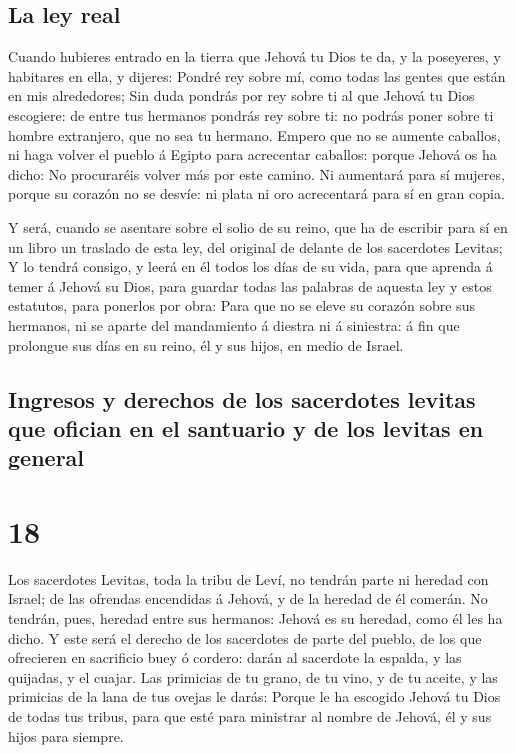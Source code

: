 \hypertarget{la-ley-real}{%
\subsection{La ley real}\label{la-ley-real}}

 Cuando hubieres entrado en la tierra que Jehová tu Dios
te da, y la poseyeres, y habitares en ella, y dijeres: Pondré rey sobre
mí, como todas las gentes que están en mis alrededores; 
Sin duda pondrás por rey sobre ti al que Jehová tu Dios escogiere: de
entre tus hermanos pondrás rey sobre ti: no podrás poner sobre ti hombre
extranjero, que no sea tu hermano.  Empero que no se
aumente caballos, ni haga volver el pueblo á Egipto para acrecentar
caballos: porque Jehová os ha dicho: No procuraréis volver más por este
camino.  Ni aumentará para sí mujeres, porque su corazón
no se desvíe: ni plata ni oro acrecentará para sí en gran copia.

 Y será, cuando se asentare sobre el solio de su reino,
que ha de escribir para sí en un libro un traslado de esta ley, del
original de delante de los sacerdotes Levitas;  Y lo
tendrá consigo, y leerá en él todos los días de su vida, para que
aprenda á temer á Jehová su Dios, para guardar todas las palabras de
aquesta ley y estos estatutos, para ponerlos por obra: 
Para que no se eleve su corazón sobre sus hermanos, ni se aparte del
mandamiento á diestra ni á siniestra: á fin que prolongue sus días en su
reino, él y sus hijos, en medio de Israel.

\hypertarget{ingresos-y-derechos-de-los-sacerdotes-levitas-que-ofician-en-el-santuario-y-de-los-levitas-en-general}{%
\subsection{Ingresos y derechos de los sacerdotes levitas que ofician en
el santuario y de los levitas en
general}\label{ingresos-y-derechos-de-los-sacerdotes-levitas-que-ofician-en-el-santuario-y-de-los-levitas-en-general}}

\hypertarget{section-05-18}{%
\section{18}\label{section-05-18}}

 Los sacerdotes Levitas, toda la tribu de Leví, no tendrán
parte ni heredad con Israel; de las ofrendas encendidas á Jehová, y de
la heredad de él comerán.  No tendrán, pues, heredad entre
sus hermanos: Jehová es su heredad, como él les ha dicho. 
Y este será el derecho de los sacerdotes de parte del pueblo, de los que
ofrecieren en sacrificio buey ó cordero: darán al sacerdote la espalda,
y las quijadas, y el cuajar.  Las primicias de tu grano,
de tu vino, y de tu aceite, y las primicias de la lana de tus ovejas le
darás:  Porque le ha escogido Jehová tu Dios de todas tus
tribus, para que esté para ministrar al nombre de Jehová, él y sus hijos
para siempre.

